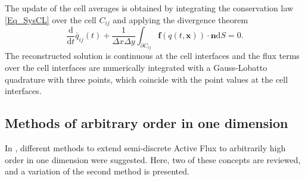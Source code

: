 \documentclass[12pt,a4paper]{article}
\begin{document}
The update of the cell averages is obtained by integrating the conservation law \eqref{Eq_SysCL} over the cell \(C_{ij}\) and applying the divergence theorem
\begin{equation*}
	\frac{\mathrm d}{\mathrm d t} \bar q_{ij} (t) + \frac{1}{\Delta x \Delta y} \int_{\partial C_{ij}} \mathbf f\left(q(t, \mathbf x)\right) \cdot \mathbf n \mathrm{d}S = 0.
\end{equation*}
The reconstructed solution is continuous at the cell interfaces and the flux terms over the cell interfaces are numerically integrated with a Gauss-Lobatto quadrature with three points, which coincide with the point values at the cell interfaces. 




\subsection{Methods of arbitrary order in one dimension}
In \cite{AB2023ExtensionAF}, different methods to extend semi-discrete Active Flux to arbitrarily high order in one dimension were suggested. Here, two of these concepts are reviewed, and a variation of the second method is presented.
\end{document}
